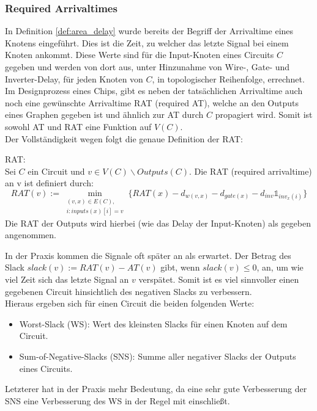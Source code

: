 \documentclass[11pt, a4paper, german]{article}
\begin{document}
\subsubsection{Required Arrivaltimes}
\label{subsec:rat}
In Definition \ref{def:area_delay} wurde bereits der Begriff der Arrivaltime eines Knotens eingeführt. Dies ist die Zeit, zu welcher das letzte Signal bei einem Knoten ankommt. Diese Werte sind für die Input-Knoten eines Circuits $C$ gegeben und werden von dort aus, unter Hinzunahme von Wire-, Gate- und Inverter-Delay, für jeden Knoten von $C$, in topologischer Reihenfolge, errechnet.\\
Im Designprozess eines Chips, gibt es neben der tatsächlichen Arrivaltime auch noch eine  gewünschte Arrivaltime RAT (required AT), welche an den Outputs eines Graphen gegeben ist und ähnlich zur AT durch $C$ propagiert wird. Somit ist sowohl AT und RAT eine Funktion auf $V(C)$. \\
Der Vollständigkeit wegen folgt die genaue Definition der RAT:\\

\begin{definition}{RAT:}\\
	Sei $C$ ein Circuit und $v \in V(C)\backslash  Outputs(C)$. Die RAT (required arrivaltime) an v ist definiert durch:
	\[   RAT(v) := \min\limits_{ \substack{(v,x)\in E(C), \\ i: inputs(x)[i] = v }} \{ RAT(x) - d_{w(v,x)} - d_{gate(x)} - d_{inv} \mathbb{1}_{inv_x(i)} \}\] 
	Die RAT der Outputs wird hierbei (wie das Delay der Input-Knoten) als gegeben angenommen. 
\end{definition}

In der Praxis kommen die Signale oft später an als erwartet. Der Betrag des Slack $slack(v) := RAT(v) - AT(v)$ gibt, wenn $slack(v) \leq 0 $, an, um wie viel Zeit sich das letzte Signal an $v$ verspätet. Somit ist es viel sinnvoller einen gegebenen Circuit hinsichtlich des negativen Slacks zu verbessern. \\
Hieraus ergeben sich für einen Circuit die beiden folgenden Werte: 
\begin{itemize}
	\item Worst-Slack (WS): Wert des kleinsten Slacks für einen Knoten auf dem Circuit.
	\item Sum-of-Negative-Slacks (SNS): Summe aller negativer Slacks der Outputs eines Circuits.
\end{itemize}
Letzterer hat in der Praxis mehr Bedeutung, da eine sehr gute Verbesserung der SNS eine Verbesserung des WS in der Regel mit einschließt. \\
\end{document}
